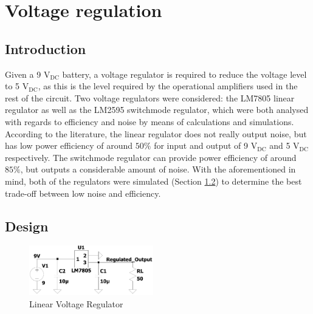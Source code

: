 \chapter{Voltage regulation}\label{ch:voltageRegulation}

\section{Introduction} \label{sec:voltIntro}

Given a 9 $\mathrm{V_{DC}}$ battery, a voltage regulator is required to reduce the voltage level to 5 $\mathrm{V_{DC}}$, as this is the level required by the operational amplifiers used in the rest of the circuit. Two voltage regulators were considered: the LM7805 linear regulator as well as the LM2595 switchmode regulator, which were both analysed with regards to efficiency and noise by means of calculations and simulations. According to the literature, the linear regulator does not really output noise, but has low power efficiency of around $50\%$ for input and output of 9 $\mathrm{V_{DC}}$ and 5 $\mathrm{V_{DC}}$\cite{lm7805} respectively. The switchmode regulator can provide power efficiency of around $85\%$, but outputs a considerable amount of noise\cite{lm2595}. With the aforementioned in mind, both of the regulators were simulated (Section \ref{sec:voltDesign}) to determine the best trade-off between low noise and efficiency.

\section{Design} \label{sec:voltDesign}

\begin{figure}
	\vspace{-1.3cm}
    \centering
    \includegraphics[width = 0.48\textwidth]{Figures/LR.pdf}
    \caption{Linear Voltage Regulator}
    \label{fig:LR}
\end{figure}

